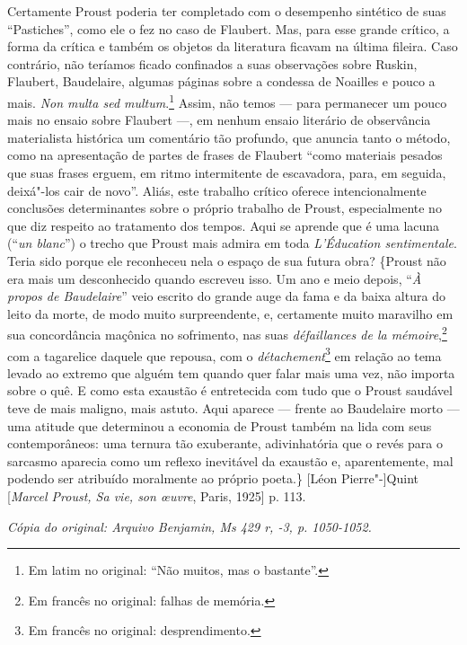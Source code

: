Certamente Proust poderia ter completado com o desempenho sintético de
suas ``Pastiches'', como ele o fez no caso de Flaubert. Mas, para esse
grande crítico, a forma da crítica e também os objetos da literatura
ficavam na última fileira. Caso contrário, não teríamos ficado
confinados a suas observações sobre Ruskin, Flaubert, Baudelaire,
algumas páginas sobre a condessa de Noailles e pouco a mais. \emph{Non
multa sed multum}.\footnote{Em latim no original: ``Não muitos,
  mas o bastante''. \versal{[N. T.]}} Assim, não temos --- para permanecer um pouco mais
no ensaio sobre Flaubert ---, em nenhum ensaio literário de observância
materialista histórica um comentário tão profundo, que anuncia tanto o
método, como na apresentação de partes de frases de Flaubert ``como
materiais pesados que suas frases erguem, em ritmo intermitente de
escavadora, para, em seguida, deixá"-los cair de novo''. Aliás, este
trabalho crítico oferece intencionalmente conclusões determinantes sobre
o próprio trabalho de Proust, especialmente no que diz respeito ao
tratamento dos tempos. Aqui se aprende que é uma lacuna (``\emph{un
blanc}'') o trecho que Proust mais admira em toda \emph{L'Éducation
sentimentale}. Teria sido porque ele reconheceu nela o espaço de sua
futura obra? \{Proust não era mais um desconhecido quando escreveu isso.
Um ano e meio depois, ``\emph{À propos de Baudelaire}'' veio escrito do
grande auge da fama e da baixa altura do leito da morte, de modo muito
surpreendente, e, certamente muito maravilho em sua concordância
maçônica no sofrimento, nas suas \emph{défaillances de la
mémoire},\footnote{Em francês no original: falhas de memória. \versal{[N. T.]}}
com a tagarelice daquele que repousa, com o \emph{détachement}\footnote{Em francês no original: desprendimento. \versal{[N. T.]}} em
relação ao tema levado ao extremo que alguém tem quando quer falar mais uma
vez, não importa sobre o quê. E como esta exaustão é entretecida com
tudo que o Proust saudável teve de mais maligno, mais astuto. Aqui
aparece --- frente ao Baudelaire morto --- uma atitude que determinou a
economia de Proust também na lida com seus contemporâneos: uma ternura
tão exuberante, adivinhatória que o revés para o sarcasmo aparecia como
um reflexo inevitável da exaustão e, aparentemente, mal podendo ser
atribuído moralmente ao próprio poeta.\} {[}Léon Pierre"-{]}Quint
{[}\emph{Marcel Proust, Sa vie, son \oe uvre}, Paris, 1925{]} p. 113.

\begin{flushright}
\emph{\small{Cópia do original: Arquivo Benjamin, Ms 429 r, -3, p. 1050-1052.}}
\end{flushright}

